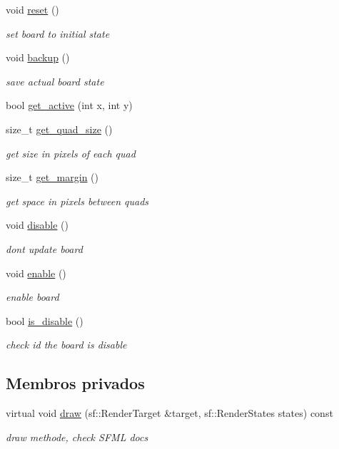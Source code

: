 \begin{DoxyCompactItemize}
void \hyperlink{classQuadBoard_a06118c0b36ac779243109674e2b067f7}{reset} ()
\begin{DoxyCompactList}\small\item\em set board to initial state \end{DoxyCompactList}\item 
void \hyperlink{classQuadBoard_a0fc9b6ffdaaeba3c71e484c0f8ece0b1}{backup} ()
\begin{DoxyCompactList}\small\item\em save actual board state \end{DoxyCompactList}\item 
bool \hyperlink{classQuadBoard_ab1d424a6388392ea3eb30cdfedb523c1}{get\+\_\+active} (int x, int y)
\item 
size\+\_\+t \hyperlink{classQuadBoard_a5d707ba2eb22707cd295117276b0bf9e}{get\+\_\+quad\+\_\+size} ()
\begin{DoxyCompactList}\small\item\em get size in pixels of each quad \end{DoxyCompactList}\item 
size\+\_\+t \hyperlink{classQuadBoard_abba94e5dec0897d1c17b6ffae8d2b001}{get\+\_\+margin} ()
\begin{DoxyCompactList}\small\item\em get space in pixels between quads \end{DoxyCompactList}\item 
void \hyperlink{classQuadBoard_aaa5d7e08e743372676a74d26e0806506}{disable} ()
\begin{DoxyCompactList}\small\item\em dont update board \end{DoxyCompactList}\item 
void \hyperlink{classQuadBoard_aa35b8ed541a1e56bd720bce2d73c5211}{enable} ()
\begin{DoxyCompactList}\small\item\em enable board \end{DoxyCompactList}\item 
bool \hyperlink{classQuadBoard_a3017a3c075ef268c369b27c3a0175479}{is\+\_\+disable} ()
\begin{DoxyCompactList}\small\item\em check id the board is disable \end{DoxyCompactList}\end{DoxyCompactItemize}
\subsection*{Membros privados}
\begin{DoxyCompactItemize}
\item 
virtual void \hyperlink{classQuadBoard_a40468c9832e6bbbdf3231fddc60a8521}{draw} (sf\+::\+Render\+Target \&target, sf\+::\+Render\+States states) const
\begin{DoxyCompactList}\small\item\em draw methode, check S\+F\+ML docs \end{DoxyCompactList}\end{DoxyCompactItemize}
